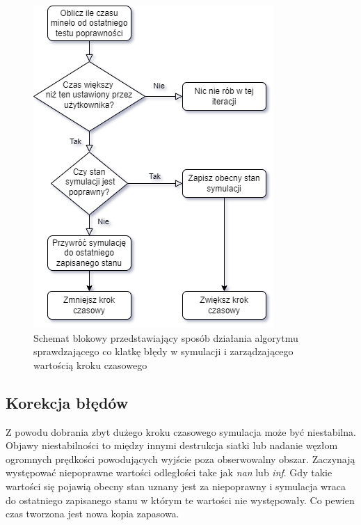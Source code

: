 \documentclass[12pt, letterpaper]{report}
\begin{document}
    \clearpage
    \begin{figure}
        \includegraphics[width=0.95\linewidth]{error_correction.drawio.png}
        \caption{
            Schemat blokowy przedstawiający sposób działania
            algorytmu sprawdzającego co klatkę
            błędy w symulacji i zarządzającego wartością kroku czasowego
        }
    \end{figure}

    \subsection{Korekcja błędów}
    Z powodu dobrania zbyt dużego kroku czasowego symulacja może być niestabilna.
    Objawy niestabilności to między innymi destrukcja siatki lub nadanie węzłom 
    ogromnych prędkości powodujących wyjście poza obserwowalny obszar.
    Zaczynają występować niepoprawne wartości odległości take jak \emph{nan} lub \emph{inf}.
    Gdy takie wartości się pojawią obecny stan uznany jest za niepoprawny i 
    symulacja wraca do ostatniego zapisanego stanu w którym 
    te wartości nie występowały. Co pewien czas tworzona jest nowa kopia zapasowa. \\
\end{document}
